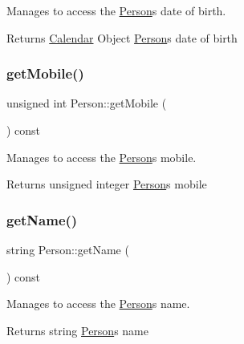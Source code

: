 Manages to access the \hyperlink{class_person}{Person}\textquotesingle{}s date of birth. 

\begin{DoxyReturn}{Returns}
\hyperlink{class_calendar}{Calendar} Object \hyperlink{class_person}{Person}\textquotesingle{}s date of birth 
\end{DoxyReturn}
\mbox{\label{class_person_aac79622064676ce915e2caff620f9af4}} 
\subsubsection{\texorpdfstring{get\+Mobile()}{getMobile()}}
{\footnotesize\ttfamily unsigned int Person\+::get\+Mobile (\begin{DoxyParamCaption}{ }\end{DoxyParamCaption}) const}



Manages to access the \hyperlink{class_person}{Person}\textquotesingle{}s mobile. 

\begin{DoxyReturn}{Returns}
unsigned integer \hyperlink{class_person}{Person}\textquotesingle{}s mobile 
\end{DoxyReturn}
\mbox{\label{class_person_a9db2e2ccfc6cfa0d7979613ec2aaa922}} 
\subsubsection{\texorpdfstring{get\+Name()}{getName()}}
{\footnotesize\ttfamily string Person\+::get\+Name (\begin{DoxyParamCaption}{ }\end{DoxyParamCaption}) const}



Manages to access the \hyperlink{class_person}{Person}\textquotesingle{}s name. 

\begin{DoxyReturn}{Returns}
string \hyperlink{class_person}{Person}\textquotesingle{}s name 
\end{DoxyReturn}
\mbox{\label{class_person_a9591e789fdcc361389a301d6da3a9376}} 
